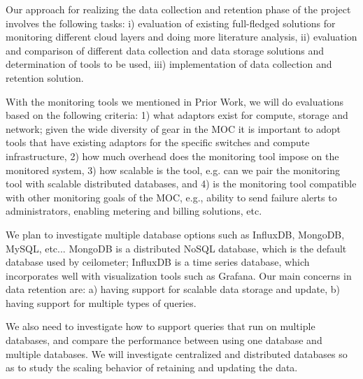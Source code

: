 Our approach for realizing the data collection and retention phase of the project involves the following tasks: i) evaluation of existing full-fledged solutions for monitoring different cloud layers and doing more literature analysis, ii) evaluation and comparison of different data collection and data storage solutions and determination of tools to be used, iii) implementation of data collection and retention solution. 

With the monitoring tools we mentioned in Prior Work, we will do evaluations based on the following criteria: 1) what adaptors exist for compute, storage and network; given the wide diversity of gear in the MOC it is important to adopt tools that have existing adaptors for the specific switches and compute infrastructure, 2) how much overhead does the monitoring tool impose on the monitored system, 3) how scalable is the tool, e.g. can we pair the monitoring tool with scalable distributed databases, and 4) is the monitoring tool compatible with other monitoring goals of the MOC, e.g., ability to send failure alerts to administrators, enabling metering and billing solutions, etc.

We plan to investigate multiple database options such as InfluxDB, MongoDB, MySQL, etc... MongoDB is a distributed NoSQL database, which is the default database used by ceilometer; InfluxDB is a time series database, which incorporates well with visualization tools such as Grafana. Our main concerns in data retention are: a) having support for scalable data storage and update, b) having support for multiple types of queries.

We also need to investigate how to support queries that run on multiple databases, and compare the performance between using one database and multiple databases. We will investigate centralized and distributed databases so as to study the scaling behavior of retaining and updating the data. 
